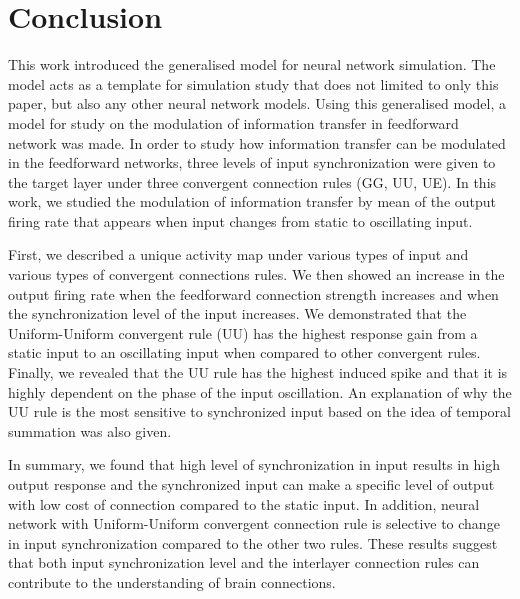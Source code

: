\chapter{Conclusion}

This work introduced the generalised model for neural network simulation. The model acts as a template for simulation study that does not limited to only this paper, but also any other neural network models. Using this generalised model, a model for study on the modulation of information transfer in feedforward network was made. 
In order to study how information transfer can be modulated in the feedforward networks, three levels of input synchronization were given to the target layer under three convergent connection rules (GG, UU, UE). In this work, we studied the modulation of information transfer by mean of the output firing rate that appears when input changes from static to oscillating input.

First, we described a unique activity map under various types of input and various types of convergent connections rules. We then showed an increase in the output firing rate when the feedforward connection strength increases and when the synchronization level of the input increases. We demonstrated that the Uniform-Uniform convergent rule (UU) has the highest response gain from a static input to an oscillating input when compared to other convergent rules. Finally, we revealed that the UU rule has the highest induced spike and that it is highly dependent on the phase of the input oscillation. An explanation of why the UU rule is the most sensitive to synchronized input based on the idea of temporal summation was also given.


In summary, we found that high level of synchronization in input results in high output response and the synchronized input can make a specific level of output with low cost of connection compared to the static input. In addition, neural network with Uniform-Uniform convergent connection rule is selective to change in input synchronization compared to the other two rules. These results suggest that both input synchronization level and the interlayer connection rules can contribute to the understanding of brain connections. 

\paragraph{} 


